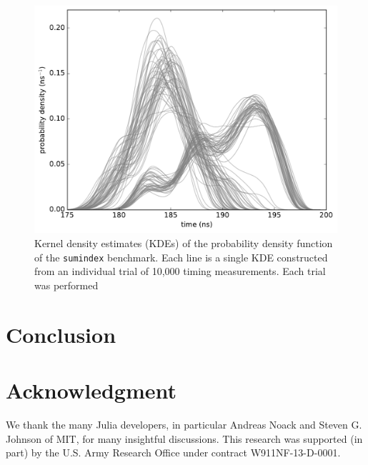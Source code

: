 \documentclass[conference]{IEEEtran}
\begin{document}

\begin{figure}[!t]
\centering
\includegraphics[width=\columnwidth]{figures/fig4/kde_pdf_sumindex}
\caption{Kernel density estimates (KDEs) of the probability density function of the
\lstinline|sumindex| benchmark. Each line is a single KDE constructed from an
individual trial of 10,000 timing measurements. Each trial was performed}
\label{fig:pdfsumindex}
\end{figure}


\label{sec:conclusion}
\section{Conclusion}

\label{sec:acknowledgement}
\section*{Acknowledgment}

We thank the many Julia developers, in particular Andreas Noack and Steven G.
Johnson of MIT, for many insightful discussions.
This research was supported (in part) by the U.S. Army Research Office under
contract W911NF-13-D-0001.




\end{document}

